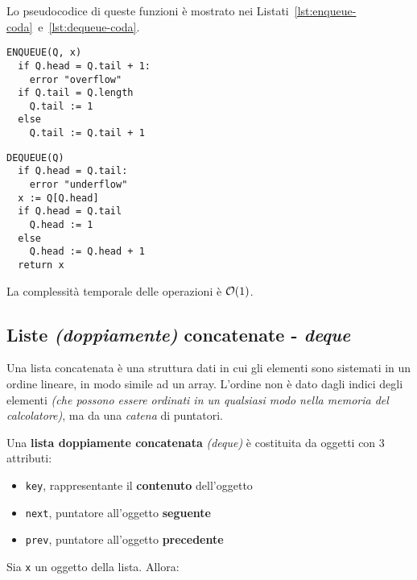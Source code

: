 \documentclass[italian, 10pt]{article}
\begin{document}
\bigskip
Lo pseudocodice di queste funzioni è mostrato nei Listati~\ref{lst:enqueue-coda}~e~\ref{lst:dequeue-coda}.

\begin{minipage}[t]{0.495\textwidth}
  \begin{lstlisting}[style=pseudocode, caption={\texttt{ENQUEUE} in coda}, label={lst:enqueue-coda}]
ENQUEUE(Q, x)
  if Q.head = Q.tail + 1:
    error "overflow"
  if Q.tail = Q.length
    Q.tail := 1
  else
    Q.tail := Q.tail + 1
  \end{lstlisting}
\end{minipage}
\begin{minipage}[t]{0.495\textwidth}
  \begin{lstlisting}[style=pseudocode, caption={\texttt{DEQUEUE} in coda}, label={lst:dequeue-coda}]
DEQUEUE(Q)
  if Q.head = Q.tail:
    error "underflow"
  x := Q[Q.head]
  if Q.head = Q.tail
    Q.head := 1
  else
    Q.head := Q.head + 1
  return x
  \end{lstlisting}
\end{minipage}

La complessità temporale delle operazioni è \(\mathcal{O}(1)\).

\subsection{Liste \textit{(doppiamente)} concatenate - \textit{deque}}
\label{sec:liste-concatenate}

Una lista concatenata è una struttura dati in cui gli elementi sono sistemati in un ordine lineare, in modo simile ad un array.
L'ordine non è dato dagli indici degli elementi \textit{(che possono essere ordinati in un qualsiasi modo nella memoria del calcolatore)}, ma da una \textit{catena} di puntatori.

Una \textbf{lista doppiamente concatenata} \textit{(deque)} è costituita da oggetti con \(3\) attributi:

\begin{itemize}
  \item \texttt{key}, rappresentante il \textbf{contenuto} dell'oggetto
  \item \texttt{next}, puntatore all'oggetto \textbf{seguente}
  \item \texttt{prev}, puntatore all'oggetto \textbf{precedente}
\end{itemize}

Sia \texttt{x} un oggetto della lista.
Allora:
\end{document}
